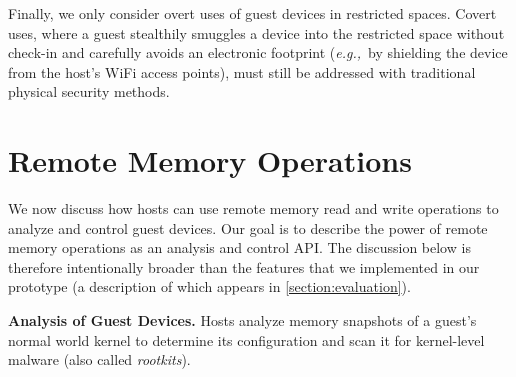 \documentclass[pageno]{sig-alternate-05-2015}
\newcommand{\mysection}[1]{\section{#1}}
\newcommand{\sectref}[1]{\autoref{#1}}
\newcommand{\myparagraph}[1]{\indent\par\noindent\textsf{\textbf{#1.}}}
\newcommand{\eg}{\textit{e.g.,}}
\newcommand{\addtext}[2]{#2}
\begin{document}

Finally, we only consider overt uses of guest devices in restricted spaces.
Covert uses, where a guest stealthily smuggles a device into the restricted
space without check-in and carefully avoids an electronic footprint (\eg~by
shielding the device from the host's WiFi access points), must still be
addressed with traditional physical security methods.

% 

\mysection{Remote Memory Operations}
\label{section:policy}

We now discuss how hosts can use remote memory read and write operations to
analyze and control guest devices. 
\addtext{Task 2}{Our goal is to describe the power of remote memory operations
as an analysis and control API. The discussion below is therefore intentionally
broader than the features that we implemented in our prototype (a description
of which appears in \sectref{section:evaluation}).}

\myparagraph{Analysis of Guest Devices}
%
Hosts analyze memory snapshots of a guest's normal world kernel to determine
its configuration and scan it for kernel-level malware (also called
\textit{rootkits}).
\end{document}

